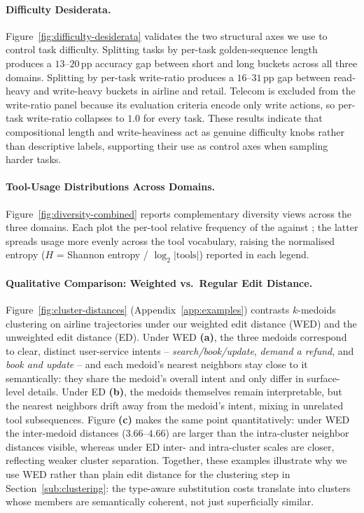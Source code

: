 \paragraph{Difficulty Desiderata.}
\label{app:difficulty-desiderata}

Figure~\ref{fig:difficulty-desiderata} validates the two structural axes we use to control task difficulty. Splitting tasks by per-task golden-sequence length produces a $13$--$20$\,pp accuracy gap between short and long buckets across all three domains. Splitting by per-task write-ratio produces a $16$--$31$\,pp gap between read-heavy and write-heavy buckets in airline and retail. Telecom is excluded from the write-ratio panel because its evaluation criteria encode only write actions, so per-task write-ratio collapses to $1.0$ for every task. These results indicate that compositional length and write-heaviness act as genuine difficulty knobs rather than descriptive labels, supporting their use as control axes when sampling harder tasks.

\paragraph{Tool-Usage Distributions Across Domains.}
\label{app:tool-use-dist}
Figure~\ref{fig:diversity-combined} reports complementary diversity views across the three \taubench domains. Each plot the per-tool relative frequency of the \tbv\xspace against \ourbenchmark; the latter spreads usage more evenly across the tool vocabulary, raising the normalised entropy ($H$ = Shannon entropy / $\log_2 |\text{tools}|$) reported in each legend.


\paragraph{Qualitative Comparison: Weighted vs.\ Regular Edit Distance.}
\label{app:wed-qualitative}
Figure~\ref{fig:cluster-distances} (Appendix~\ref{app:examples}) contrasts $k$-medoids clustering on airline trajectories under our weighted edit distance (WED) and the unweighted edit distance (ED). Under WED \textbf{(a)}, the three medoids correspond to clear, distinct user-service intents -- \emph{search/book/update}, \emph{demand a refund}, and \emph{book and update} -- and each medoid's nearest neighbors stay close to it semantically: they share the medoid's overall intent and only differ in surface-level details. Under ED \textbf{(b)}, the medoids themselves remain interpretable, but the nearest neighbors drift away from the medoid's intent, mixing in unrelated tool subsequences. Figure \textbf{(c)} makes the same point quantitatively: under WED the inter-medoid distances ($3.66$--$4.66$) are larger than the intra-cluster neighbor distances visible, whereas under ED inter- and intra-cluster scales are closer, reflecting weaker cluster separation. Together, these examples illustrate why we use WED rather than plain edit distance for the clustering step in Section~\ref{sub:clustering}: the type-aware substitution costs translate into clusters whose members are semantically coherent, not just superficially similar.
